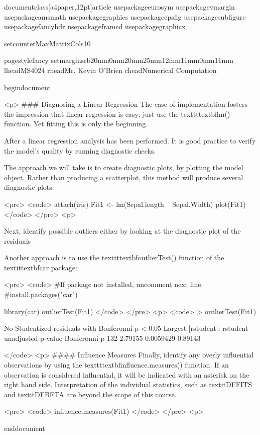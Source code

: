 documentclass[a4paper,12pt]{article}
usepackage{eurosym}
usepackage{vmargin}
usepackage{amsmath}
usepackage{graphics}
usepackage{epsfig}
usepackage{subfigure}
usepackage{fancyhdr}
usepackage{framed}
usepackage{graphicx}

setcounter{MaxMatrixCols}{10}

pagestyle{fancy}
setmarginsrb{20mm}{0mm}{20mm}{25mm}{12mm}{11mm}{0mm}{11mm}
lhead{MS4024} rhead{Mr. Kevin O'Brien}
chead{Numerical Computation}

begin{document}

<p>
### {Diagnosing a Linear Regression}
The ease of implementation fosters the impression that linear regression is easy: just use the texttt{textbf{lm()}} function. Yet fitting
this is only the beginning.

After a linear regression analysis has been performed. It is good practice to verify the model’s quality
by running diagnostic checks.

The approach we will take is to create diagnostic plots, by plotting the model object. Rather than producing a scatterplot, this method will produce several diagnostic plots:

<pre>
<code>
attach(iris)
Fit1 <- lm(Sepal.length ~ Sepal.Width)
plot(Fit1)
</code> 
</pre>
<p>

Next, identify possible outliers either by looking at the diagnostic plot of the residuals

Another approach is to use the texttt{textbf{outlierTest()}} function of the textit{textbf{car}} package:


<pre>
<code>
#If package not installed, uncomment next line.
#install.packages("car")

library(car)
outlierTest(Fit1)
</code> 
</pre>
<p>
<code>
> outlierTest(Fit1)

No Studentized residuals with Bonferonni p < 0.05
Largest |rstudent|:
    rstudent unadjusted p-value Bonferonni p
132  2.79155          0.0059429      0.89143

</code>
<p>
#### {Influence Measures}
Finally, identify any overly influential observations by using the texttt{textbf{influence.measures()}} 
function.
If an observation is considered influential, it will be indicated with an asterisk on the right hand side. Interpretation of the individual statistics, such as textit{DFFITS} and textit{DFBETA} are beyond the scope of this course.

<pre>
<code>
influence.measures(Fit1)
</code> 
</pre>
<p>

end{document}
